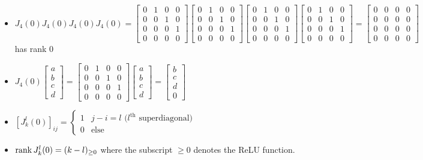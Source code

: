 \begin{remark*}
\begin{itemize}
    \item $J_4(0) J_4(0) J_4(0) J_4(0) = \begin{bmatrix} 0 & 1 & 0 & 0 \\ 0 & 0 & 1 & 0 \\ 0 & 0 & 0 & 1 \\ 0 & 0 & 0 & 0\end{bmatrix} \begin{bmatrix} 0 & 1 & 0 & 0 \\ 0 & 0 & 1 & 0 \\ 0 & 0 & 0 & 1 \\ 0 & 0 & 0 & 0\end{bmatrix} \begin{bmatrix} 0 & 1 & 0 & 0 \\ 0 & 0 & 1 & 0 \\ 0 & 0 & 0 & 1 \\ 0 & 0 & 0 & 0\end{bmatrix} \begin{bmatrix} 0 & 1 & 0 & 0 \\ 0 & 0 & 1 & 0 \\ 0 & 0 & 0 & 1 \\ 0 & 0 & 0 & 0\end{bmatrix} = \begin{bmatrix} 0 & 0 & 0 & 0 \\ 0 & 0 & 0 & 0 \\ 0 & 0 & 0 & 0 \\ 0 & 0 & 0 & 0 \end{bmatrix}$ has rank 0
    \item $J_4(0) \begin{bmatrix} a \\ b \\ c \\ d \end{bmatrix} = \begin{bmatrix} 0 & 1 & 0 & 0 \\ 0 & 0 & 1 & 0 \\ 0 & 0 & 0 & 1 \\ 0 & 0 & 0 & 0\end{bmatrix} \begin{bmatrix} a \\ b \\ c \\ d \end{bmatrix} = \begin{bmatrix} b \\ c \\ d \\ 0 \end{bmatrix}$ 
    \item $[J_k^l(0)]_{ij} = \begin{cases} 1 & j-i = l \text{ (}l^{\text{th}}\text{ superdiagonal)}\\ 0 & \text{else}\end{cases}$
    \item $\operatorname{rank} J_k^l(0) = (k-l)_{\geq 0}$ where the subscript $\geq 0$ denotes the ReLU function.
\end{itemize}
\end{remark*}

